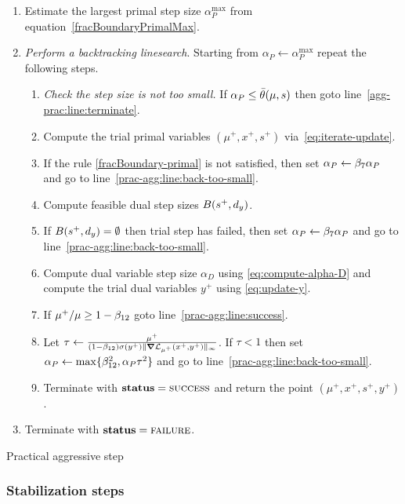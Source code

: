 \documentclass{article}
\begin{document}
\begin{algorithm}[H]
\begin{enumerate}[label*=A.{\arabic*}]
\item Estimate the largest primal step size $\alpha^{\max}_{P}$ from equation~\eqref{fracBoundaryPrimalMax}.
\item \label{agg:line:back-track} \emph{Perform a backtracking linesearch}. Starting from $\alpha_{P} \gets \alpha^{\max}_{P}$ repeat the following steps.
\begin{enumerate}[label*=.{\arabic*}]
\item \label{prac-agg:line:back-too-small} \emph{Check the step size is not too small.} If $\alpha_{P} \le \bar{\theta}(\mu, s)$ then goto line~\ref{agg-prac:line:terminate}.
\item Compute the trial primal variables $(\mu^{+}, x^{+}, s^{+})$ via~\eqref{eq:iterate-update}.
\item If the \fracBound{} rule \eqref{fracBoundary-primal} is not satisfied, then set $\alpha_{P} \gets \beta_{7} \alpha_{P}$ and go to line~\ref{prac-agg:line:back-too-small}.
\item Compute feasible dual step sizes $B( s^{+}, d_{y} )$.
\item If $B( s^{+}, d_{y} ) = \emptyset$ then trial step has failed, then set $\alpha_{P} \gets \beta_{7} \alpha_{P}$ and go to line~\ref{prac-agg:line:back-too-small}.
\item Compute dual variable step size $\alpha_{D}$ using \eqref{eq:compute-alpha-D} and compute the trial dual variables $y^{+}$ using \eqref{eq:update-y}.
\item \label{agg-protect-1} If $\mu^{+} / \mu \ge 1 - \beta_{12}$ goto line~\ref{prac-agg:line:success}.
\item \label{agg-protect-2} Let $\tau \gets \frac{\mu^{+}}{(1 - \beta_{12}) \sigma(y^{+}) \| \grad \mathcal{L}_{\mu^{+}}(x^{+},y^{+}) \|_{\infty}}$. If $\tau < 1$ then set $\alpha_{P} \gets \max\{ \beta_{12}^2 , \alpha_{P} \tau^2 \}$ and go to line~\ref{prac-agg:line:back-too-small}.
\item\label{prac-agg:line:success} Terminate with $\textbf{status} = \textsc{success}$ and return the point $(\mu^{+}, x^{+}, s^{+}, y^{+})$.
\end{enumerate}
\item \label{agg-prac:line:terminate} Terminate with $\textbf{status} = \textsc{failure}$.
\end{enumerate}
\caption{Practical aggressive step}\label{alg:aggressive}
\end{algorithm}


\subsubsection{Stabilization steps}
\end{document}
